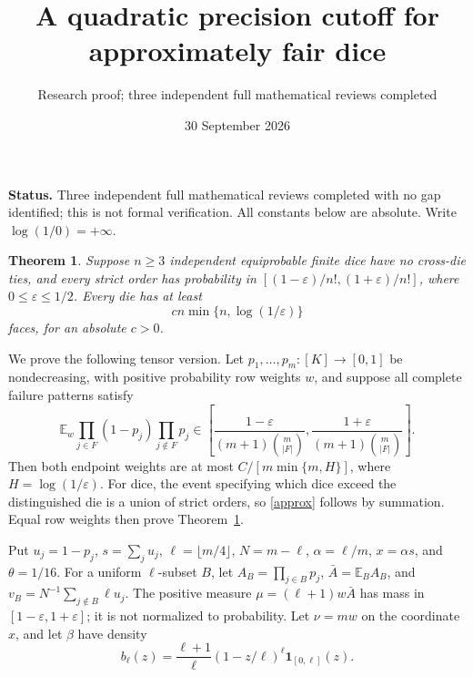 \documentclass[11pt]{article}
\title{A quadratic precision cutoff for approximately fair dice}
\author{Research proof; three independent full mathematical reviews completed}
\date{30 September 2026}
\newtheorem{theorem}{Theorem}
\newcommand{\E}{\mathbb E}
\begin{document}
\maketitle
\noindent\textbf{Status.} Three independent full mathematical reviews completed
with no gap identified; this is not formal verification.
All constants below are absolute. Write $\log(1/0)=+\infty$.

\begin{theorem}\label{main}
Suppose $n\ge3$ independent equiprobable finite dice have no cross-die
ties, and every strict order has probability in
$[(1-\varepsilon)/n!,(1+\varepsilon)/n!]$, where
$0\le\varepsilon\le1/2$. Every die has at least
\[
 c n\min\{n,\log(1/\varepsilon)\}
\]
faces, for an absolute $c>0$.
\end{theorem}

We prove the following tensor version. Let $p_1,\ldots,p_m:[K]\to[0,1]$
be nondecreasing, with positive probability row weights $w$, and suppose
all complete failure patterns satisfy
\begin{equation}\label{approx}
 \E_w\prod_{j\in F}(1-p_j)\prod_{j\notin F}p_j
 \in\left[\frac{1-\varepsilon}{(m+1)\binom m{|F|}},
           \frac{1+\varepsilon}{(m+1)\binom m{|F|}}\right].
\end{equation}
Then both endpoint weights are at most
$C/[m\min\{m,H\}]$, where $H=\log(1/\varepsilon)$.
For dice, the event specifying which dice exceed the distinguished die
is a union of strict orders, so \eqref{approx} follows by summation.
Equal row weights then prove Theorem~\ref{main}.

Put $u_j=1-p_j$, $s=\sum_j u_j$, $\ell=\lfloor m/4\rfloor$,
$N=m-\ell$, $\alpha=\ell/m$, $x=\alpha s$, and $\theta=1/16$.
For a uniform $\ell$-subset $B$, let
$A_B=\prod_{j\in B}p_j$, $\bar A=\E_B A_B$, and
$v_B=N^{-1}\sum_{j\notin B}\ell u_j$.
The positive measure $\mu=(\ell+1)w\bar A$ has mass in
$[1-\varepsilon,1+\varepsilon]$; it is not normalized to probability.
Let $\nu=mw$ on the coordinate $x$, and let $\beta$ have density
\[
 b_\ell(z)=\frac{\ell+1}{\ell}(1-z/\ell)^\ell
                    \boldsymbol1_{[0,\ell]}(z).
\]
\end{document}
